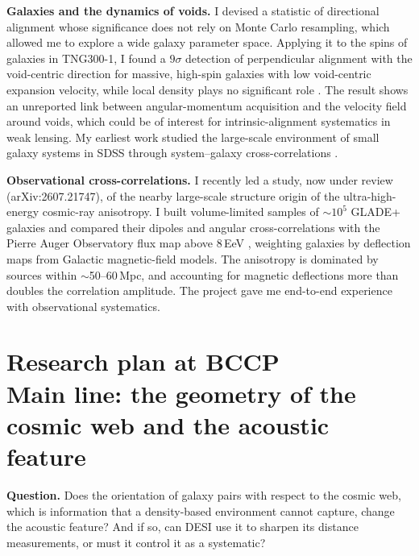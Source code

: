 \documentclass[11pt,a4paper]{article}
\begin{document}
\textbf{Galaxies and the dynamics of voids.} I devised a statistic of directional alignment whose significance does not rely on Monte Carlo resampling, which allowed me to explore a wide galaxy parameter space. Applying it to the spins of galaxies in TNG300-1, I found a $9\sigma$ detection of perpendicular alignment with the void-centric direction for massive, high-spin galaxies with low void-centric expansion velocity, while local density plays no significant role \citep{DavilaKurban2023}. The result shows an unreported link between angular-momentum acquisition and the velocity field around voids, which could be of interest for intrinsic-alignment systematics in weak lensing. My earliest work studied the large-scale environment of small galaxy systems in SDSS through system--galaxy cross-correlations \citep{Duplancic2020}.

\textbf{Observational cross-correlations.} I recently led a study, now under review (arXiv:2607.21747), of the nearby large-scale structure origin of the ultra-high-energy cosmic-ray anisotropy. I built volume-limited samples of $\sim\!10^5$ GLADE+ galaxies and compared their dipoles and angular cross-correlations with the Pierre Auger Observatory flux map above 8\,EeV \citep{Aab2017}, weighting galaxies by deflection maps from Galactic magnetic-field models. The anisotropy is dominated by sources within $\sim$50--60\,Mpc, and accounting for magnetic deflections more than doubles the correlation amplitude. The project gave me end-to-end experience with observational systematics.

\section*{Research plan at BCCP \\ Main line: the geometry of the cosmic web and the acoustic feature}

\textbf{Question.} Does the orientation of galaxy pairs with respect to the cosmic web, which is information that a density-based environment cannot capture, change the acoustic feature? And if so, can DESI use it to sharpen its distance measurements, or must it control it as a systematic?
\end{document}
